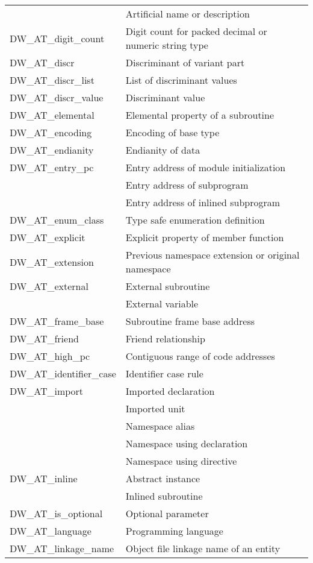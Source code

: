 \begin{longtable}{l|p{9cm}}
& Artificial name or description \\
DW\-\_AT\-\_digit\-\_count
&Digit count for packed decimal or numeric string type\\
DW\-\_AT\-\_discr
&Discriminant of variant part\\
DW\-\_AT\-\_discr\-\_list
&List of discriminant values\\
DW\-\_AT\-\_discr\-\_value
&Discriminant value\\
DW\-\_AT\-\_elemental
&Elemental property of a subroutine\\
DW\-\_AT\-\_encoding
&Encoding of base type\\
DW\-\_AT\-\_endianity
&Endianity of data\\
DW\-\_AT\-\_entry\-\_pc
&Entry address of module initialization\\
&Entry address of subprogram\\
&Entry address of inlined subprogram\\
DW\-\_AT\-\_enum\-\_class
&Type safe enumeration definition\\
DW\-\_AT\-\_explicit
&Explicit property of member function\\
DW\-\_AT\-\_extension
&Previous namespace extension or original namespace\\
DW\-\_AT\-\_external
&External subroutine\\
&External variable\\
DW\-\_AT\-\_frame\-\_base
&Subroutine frame base address\\
DW\-\_AT\-\_friend
&Friend relationship\\
DW\-\_AT\-\_high\-\_pc
&Contiguous range of code addresses\\
DW\-\_AT\-\_identifier\-\_case
&Identifier case rule \\
DW\-\_AT\-\_import
&Imported declaration \\
&Imported unit \\
&Namespace alias \\
&Namespace using declaration \\
&Namespace using directive \\
DW\-\_AT\-\_inline
&Abstract instance\\
&Inlined subroutine\\
DW\-\_AT\-\_is\-\_optional
&Optional parameter\\
DW\-\_AT\-\_language
&Programming language\\
DW\-\_AT\-\_linkage\-\_name
&Object file linkage name of an entity\\

\end{longtable}
